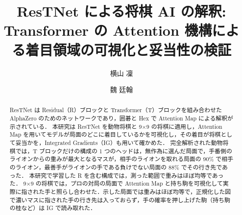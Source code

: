 \documentclass[submit]{ipsj}
\title{ResTNet による将棋 AI の解釈:\\
Transformer の Attention 機構による着目領域の可視化と妥当性の検証}
\author{横山 凜}{Rin Yokoyama}{KUT}[305151a@gs.kochi-tech.ac.jp]
\author{魏 廷翰}{Ting-Han Wei}{KUT}[tinghan.wei@kochi-tech.ac.jp]
\begin{document}
\begin{abstract}
ResTNet は Residual（R）ブロックと Transformer（T）ブロックを組み合わせた AlphaZero のためのネットワークであり，囲碁と Hex で Attention Map による解釈が示されている．
本研究は ResTNet を動物将棋と 9×9 の将棋に適用し，Attention Map を用いてモデルが局面のどこに着目しているかを可視化し，その着目が将棋として妥当かを，Integrated Gradients（IG）も用いて確かめた．
完全解析された動物将棋では，T ブロックだけの構成の 1 つのヘッドは，無作為に選んだ局面で，手番側のライオンからの重みが最大となるマスが，相手のライオンを取れる局面の 90\% で相手のライオン，最善手がライオンの手である負けでない局面の 88\% でその行き先であった．
本研究で学習した R を含む構成では，測った範囲で重みはほぼ均等であった．
9×9 の将棋では，プロの対局の局面で Attention Map と持ち駒を可視化して実際に指された手と照らし合わせた．示した局面では重みはほぼ均等で，正規化した図で濃いマスに指された手の行き先は入っておらず，手の確率を押し上げた駒（持ち駒の桂など）は IG で読み取れた．
\end{abstract}
\end{document}
